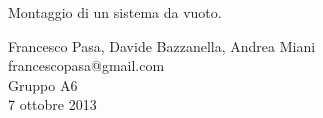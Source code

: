 \begin{center}

	\vspace{0.5cm}
     	{\huge Montaggio di un sistema da vuoto.}
	\vspace{0.5cm}

      	{\large Francesco Pasa, Davide Bazzanella, Andrea Miani} \\
      	{francescopasa@gmail.com} \\
		{\large Gruppo A6} \\
	
	\vspace{0.3cm}
      	{\large 7 ottobre 2013}
\end{center}
